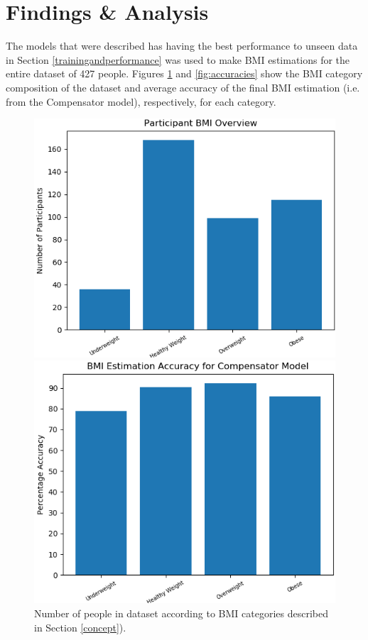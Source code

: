\documentclass[conference]{IEEEtran}
\begin{document}
\section{Findings \& Analysis}
The models that were described has having the best performance to unseen data in Section \ref{trainingandperformance} was used to make BMI estimations for the entire dataset of 427 people.
Figures \ref{fig:spread} and \ref{fig:accuracies} show the BMI category composition of the dataset and average accuracy of the final BMI estimation (i.e. from the Compensator model), respectively, for each category.
\begin{figure}
    \centering
    \begin{minipage}[b]{0.235\textwidth}
    	\includegraphics[width=\linewidth]{spread.png}
	\caption{Number of people in dataset according to BMI categories described in Section \ref{concept}).}
	\label{fig:spread}
    \end{minipage}
    \hspace{0.1cm}
    \begin{minipage}[b]{0.235\textwidth}
	\includegraphics[width=\linewidth]{accuracies.png}

\end{minipage}
\end{figure}
\end{document}

